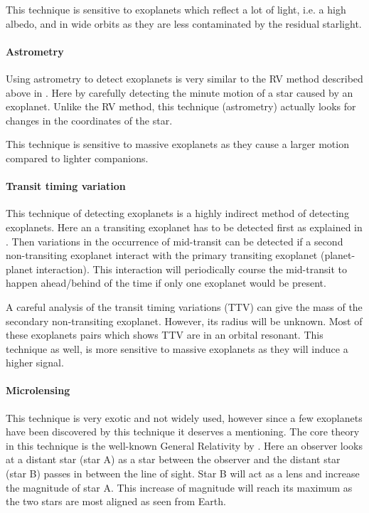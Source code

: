 This technique is sensitive to exoplanets which reflect a lot of light, i.e. a high albedo, and in
wide orbits as they are less contaminated by the residual starlight.

\paragraph{Astrometry}

Using astrometry to detect exoplanets is very similar to the RV method described above in
. Here by carefully detecting the minute motion of a star caused by an
exoplanet. Unlike the RV method, this technique (astrometry) actually looks for changes in the
coordinates of the star.

This technique is sensitive to massive exoplanets as they cause a larger motion compared to lighter
companions.


\paragraph{Transit timing variation}

This technique of detecting exoplanets is a highly indirect method of detecting exoplanets. Here an
a transiting exoplanet has to be detected first as explained in . Then
variations in the occurrence of mid-transit can be detected if a second non-transiting exoplanet
interact with the primary transiting exoplanet (planet-planet interaction). This interaction will
periodically course the mid-transit to happen ahead/behind of the time if only one exoplanet would
be present.

A careful analysis of the transit timing variations (TTV) can give the mass of the secondary
non-transiting exoplanet. However, its radius will be unknown. Most of these exoplanets pairs which
shows TTV are in an orbital resonant. This technique as well, is more sensitive to massive
exoplanets as they will induce a higher signal.


\paragraph{Microlensing}

This technique is very exotic and not widely used, however since a few exoplanets have been
discovered by this technique it deserves a mentioning. The core theory in this technique is the
well-known General Relativity by \citet{Einstein1916}. Here an observer looks at a distant star
(star A) as a star between the observer and the distant star (star B) passes in between the line of
sight. Star B will act as a lens and increase the magnitude of star A. This increase of magnitude
will reach its maximum as the two stars are most aligned as seen from Earth.

